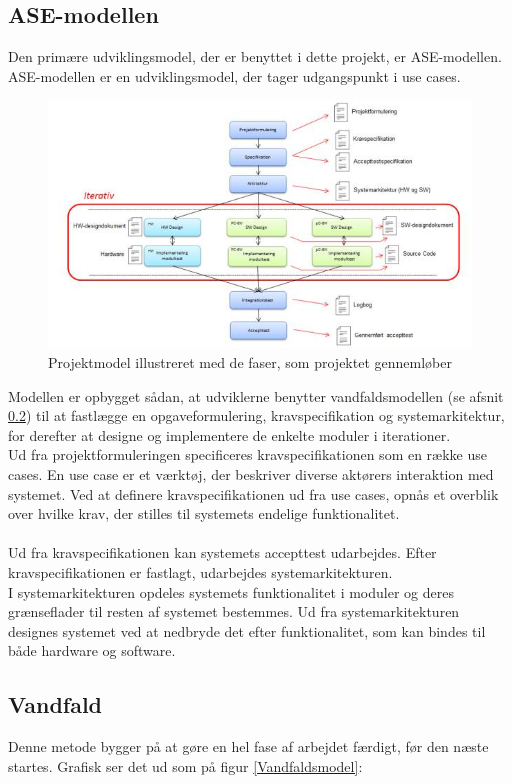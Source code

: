 \subsection{ASE-modellen}
Den primære udviklingsmodel, der er benyttet i dette projekt, er ASE-modellen. ASE-modellen er en udviklingsmodel, der tager udgangspunkt i use cases. 
\begin{figure}[H]
	\centering
	\includegraphics[width=1\textwidth]{Figurer/Metode/ASEmodellen}
	\caption{Projektmodel illustreret med de faser, som projektet gennemløber\protect\cite{IHA modellen}}
	\label{ASEmodel}
\end{figure}

Modellen er opbygget sådan, at udviklerne benytter vandfaldsmodellen (se afsnit \ref{Vandfald}) til at fastlægge en opgaveformulering, kravspecifikation og systemarkitektur, for derefter at designe og implementere de enkelte moduler i iterationer. \\ Ud fra projektformuleringen specificeres kravspecifikationen som en række use cases. En use case er et værktøj, der beskriver diverse aktørers interaktion med systemet. Ved at definere kravspecifikationen ud fra use cases, opnås et overblik over hvilke krav, der stilles til systemets endelige funktionalitet.\\ \\ Ud fra kravspecifikationen kan systemets accepttest udarbejdes. Efter kravspecifikationen er fastlagt, udarbejdes systemarkitekturen.\\ I systemarkitekturen opdeles systemets funktionalitet i moduler og deres grænseflader til resten af systemet bestemmes. Ud fra systemarkitekturen designes systemet ved at nedbryde det efter funktionalitet, som kan bindes til både hardware og software.
\subsection{Vandfald}\label{Vandfald}
Denne metode bygger på at gøre en hel fase af arbejdet færdigt, før den næste startes. Grafisk ser det ud som på figur \ref{Vandfaldsmodel}: \\


